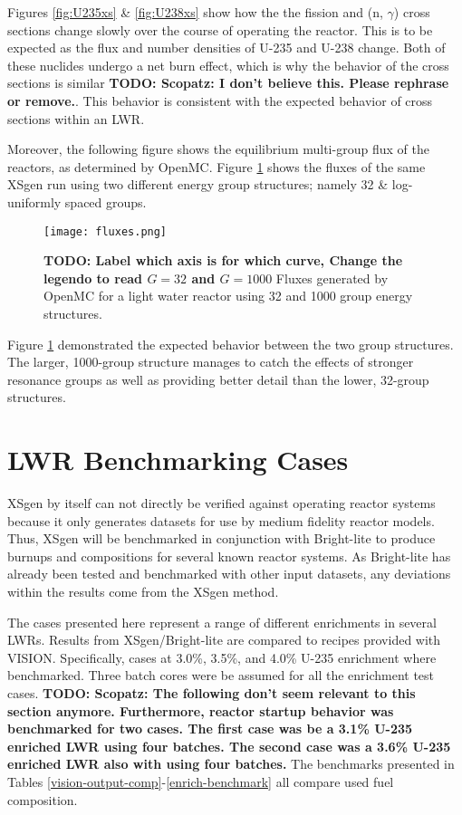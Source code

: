 \documentclass{article}
\newcommand{\TODO}[1] {{\color{red}\textbf{TODO: #1}}}
\begin{document}
Figures \ref{fig:U235xs} \& \ref{fig:U238xs} show how the the fission and (n, $\gamma$)
cross sections change slowly over the course of operating the reactor. This is to be
expected as the flux and number densities of U-235 and U-238 change. Both of these nuclides
undergo a net burn effect, which is why the behavior of the cross sections is similar
\TODO{Scopatz: I don't believe this. Please rephrase or remove.}.
This behavior is consistent with the expected behavior of cross sections within an LWR.

Moreover, the following figure shows the equilibrium multi-group flux of the reactors, as
determined by OpenMC.
Figure \ref{fig:32g} shows the fluxes of the same XSgen run using two different energy group
structures; namely 32 \& log-uniformly spaced groups.
\begin{figure}[h]
  \center
  \texttt{[image: fluxes.png]}
  \caption{\TODO{Label which axis is for which curve, Change the legendo to read $G=32$ and $G=1000$} Fluxes generated by OpenMC for a light water reactor using 32 and 1000 group energy structures.}
  \label{fig:32g}
\end{figure}
Figure \ref{fig:32g} demonstrated the expected behavior between the two group structures.
The larger, 1000-group structure manages to catch the effects of stronger resonance groups
as well as providing better detail than the lower, 32-group structures.

\section{LWR Benchmarking Cases}
XSgen by itself can not directly be verified against operating reactor systems because it
only generates datasets for use by medium fidelity reactor models.
Thus, XSgen will be benchmarked in conjunction with Bright-lite to produce burnups and
compositions for several known reactor systems. As Bright-lite has already been tested
and benchmarked with other input datasets\cite{brightlite},
any deviations within the results come from the XSgen method.

The cases presented here represent a range of different enrichments in several LWRs.
Results from XSgen/Bright-lite are compared to recipes provided with VISION\cite{vision}.
Specifically, cases at 3.0\%, 3.5\%, and 4.0\% U-235 enrichment where benchmarked.
Three batch cores were be assumed for all the enrichment test cases.
\TODO{Scopatz: The following don't seem relevant to this section anymore.
Furthermore, reactor startup behavior was benchmarked for two cases.
The first case was be a 3.1\% U-235 enriched LWR
using four batches. The second case was a 3.6\% U-235 enriched LWR also with using four
batches.
}
The benchmarks presented in Tables \ref{vision-output-comp}-\ref{enrich-benchmark}
all compare used fuel composition.
\end{document}
